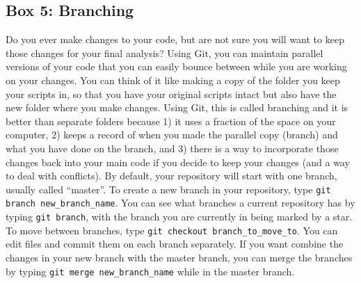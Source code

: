 \subsection{Box 5: Branching}

Do you ever make changes to your code, but are not sure you will want to keep those changes for your final analysis? Using Git, you can maintain parallel versions of your code that you can easily bounce between while you are working on your changes. You can think of it like making a copy of the folder you keep your scripts in, so that you have your original scripts intact but also have the new folder where you make changes. Using Git, this is called branching and it is better than separate folders because 1) it uses a fraction of the space on your computer, 2) keeps a record of when you made the parallel copy (branch) and what you have done on the branch, and 3) there is a way to incorporate those changes back into your main code if you decide to keep your changes (and a way to deal with conflicts). By default, your repository will start with one branch, usually called ``master''. To create a new branch in your repository, type \verb|git branch new_branch_name|. You can see what branches a current repository has by typing \verb|git branch|, with the branch you are currently in being marked by a star. To move between branches, type \verb|git checkout branch_to_move_to|. You can edit files and commit them on each branch separately. If you want combine the changes in your new branch with the master branch, you can merge the branches by typing \verb|git merge new_branch_name| while in the master branch.
